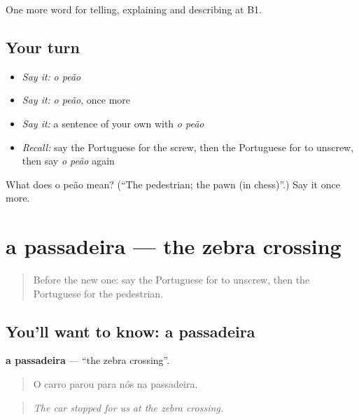 \begin{grammarlens}[title={What you've built}]
One more word for telling, explaining and describing at B1.
\end{grammarlens}

\subsection*{Your turn}
\begin{itemize}
\raggedright
  \item \emph{Say it:} \emph{o peão}
  \item \emph{Say it:} \emph{o peão}, once more
  \item \emph{Say it:} a sentence of your own with \emph{o peão}
  \item \emph{Recall:} say the Portuguese for the screw, then the Portuguese for to unscrew, then say \emph{o peão} again
\end{itemize}

\begin{tcolorbox}[breakable,colback=teal!4,colframe=teal!35!black,title={Before you move on}]
What does o peão mean? (\textquotedblleft{}The pedestrian; the pawn (in chess)\textquotedblright{}.) Say it once more.
\end{tcolorbox}
\section[a passadeira]{a passadeira — the zebra crossing}

\label{lesson:PT-C408-passadeira}



\begin{quote}
Before the new one: say the Portuguese for to unscrew, then the Portuguese for the pedestrian.
\end{quote}

\subsection*{You'll want to know: a passadeira}
\textbf{a passadeira} — \textquotedblleft{}the zebra crossing\textquotedblright{}.

\begin{quote}
O carro parou para nós na passadeira.
\end{quote}

\begin{quote}
\emph{The car stopped for us at the zebra crossing.}
\end{quote}

